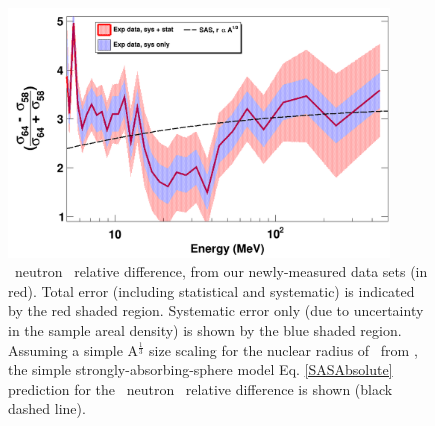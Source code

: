 \begin{figure}[tb]
    \centering
    \includegraphics[width=0.9\textwidth]{figures/relativeDiff_Ni64Ni58.png}
    \caption[\niEightFour\ neutron \tot\ relative difference]
    {
        \niEightFour\ neutron \tot\ relative difference, from our newly-measured
        data sets (in red). Total error (including statistical and systematic)
        is indicated by the red shaded region. Systematic error only (due to
        uncertainty in the sample areal density) is shown by the blue shaded region.   
        Assuming a simple A$^{\frac{1}{3}}$ size scaling for the
        nuclear radius of \niFour\ from \niEight, the simple
        strongly-absorbing-sphere model Eq. \ref{SASAbsolute} prediction
        for the \niEightFour\ neutron \tot\ relative
        difference is shown (black dashed line).
    }
    \label{IsotopicDifferenceNi}
\end{figure}

